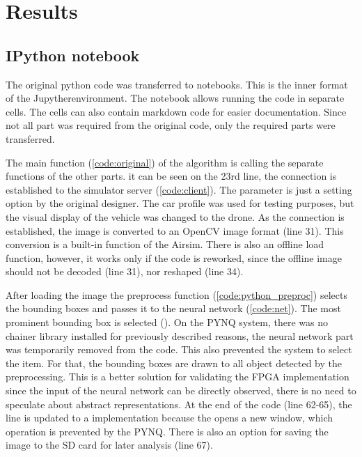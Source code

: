 \chapter{Results} \label{ch:results} %

\section{IPython notebook} %
The original python code was transferred to  notebooks.
This is the inner format of the Jupyther\texttrademark environment.
The notebook allows running the code in separate cells.
The cells can also contain markdown code for easier documentation.
Since not all part was required from the original code, only the required parts were transferred.

The main function (\cref{code:original}) of the algorithm is calling the separate functions of the other parts.
it can be seen on the 23rd line, the connection is established to the simulator server (\cref{code:client}).
The parameter  is just a setting option by the original designer.
The car profile was used for testing purposes, but the visual display of the vehicle was changed to the drone.
As the connection is established, the image is converted to an OpenCV image format (line 31).
This conversion is a built-in function of the Airsim.
There is also an offline load function, however, it works only if the code is reworked, since the offline image should not be decoded (line 31), nor reshaped (line 34).

After loading the image the preprocess function (\cref{code:python_preproc}) selects the bounding boxes and passes it to the neural network (\cref{code:net}).
The most prominent bounding box is selected ().
On the PYNQ system, there was no chainer library installed for previously described reasons, the neural network part was temporarily removed from the code.
This also prevented the system to select the  item.
For that, the bounding boxes are drawn to all object detected by the preprocessing.
This is a better solution for validating the FPGA implementation since the input of the neural network can be directly observed, there is no need to speculate about abstract representations.
At the end of the code (line 62-65), the  line is updated to a  implementation because the  opens a new window, which operation is prevented by the PYNQ.
There is also an option for saving the image to the SD card for later analysis (line 67).


